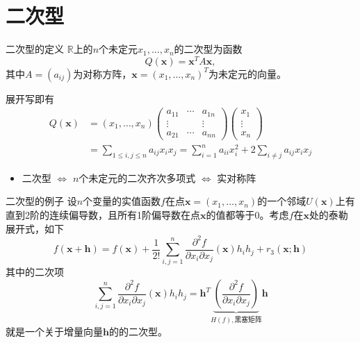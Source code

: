 \documentclass[10pt]{beamer}
\begin{document}

\section{二次型}


\begin{frame}

\begin{block}{二次型的定义}
$\mathbb{R}$上的$n$个未定元$x_1,\ldots,x_n$的二次型为函数
$$Q(\mathbf{x}) = \mathbf{x}^TA\mathbf{x},$$
其中$A = (a_{ij})$为对称方阵，$\mathbf{x} = (x_1,\ldots,x_n)^T$为未定元的向量。

\pause

展开写即有
\begin{align*}
Q(\mathbf{x}) & = (x_1,\ldots,x_n) \begin{pmatrix} a_{11} & \cdots & a_{1n} \\ \vdots & & \vdots \\ a_{21} & \cdots & a_{nn} \end{pmatrix} \begin{pmatrix} x_1 \\ \vdots \\ x_n \end{pmatrix} \\
& = \sum\limits_{1\leqslant i,j \leqslant n} a_{ij}x_ix_j = \sum\limits_{i=1}^{n} a_{ii}x_i^2 + 2\sum\limits_{i\neq j} a_{ij}x_ix_j
\end{align*}

\pause

\begin{itemize}
\item 二次型 $\Longleftrightarrow$ $n$个未定元的二次齐次多项式 $\Longleftrightarrow$ 实对称阵
\end{itemize}
\end{block}

\end{frame}


\begin{frame}

\begin{block}{二次型的例子}
设$n$个变量的实值函数$f$在点$\mathbf{x} = (x_1,\ldots,x_n)$的一个邻域$U(\mathbf{x})$上有直到2阶的连续偏导数，且所有1阶偏导数在点$\mathbf{x}$的值都等于0。考虑$f$在$\mathbf{x}$处的泰勒展开式，如下
$$f(\mathbf{x} + \mathbf{h}) = f(\mathbf{x}) + \dfrac{1}{2!} \sum\limits_{i,j=1}^n \dfrac{\partial^2 f}{\partial x_i \partial x_j}(\mathbf{x})h_ih_j + r_3(\mathbf{x}; \mathbf{h})$$
其中的二次项
$$\sum\limits_{i,j=1}^n \dfrac{\partial^2 f}{\partial x_i \partial x_j}(\mathbf{x})h_ih_j = \mathbf{h}^T \underbrace{\left( \dfrac{\partial^2 f}{\partial x_i \partial x_j} \right)}_{H(f), \text{黑塞矩阵}} \mathbf{h}$$
就是一个关于增量向量$\mathbf{h}$的的二次型。
\end{block}

\end{frame}
\end{document}

